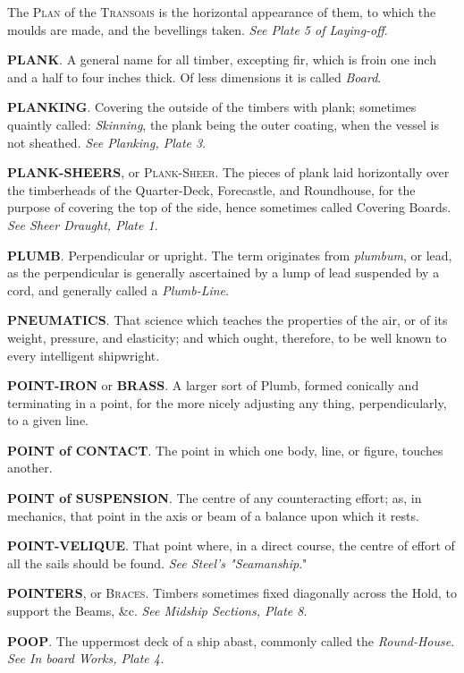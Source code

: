 The \textsc{Plan} of the \textsc{Transoms} is the horizontal appearance of them, to which the moulds are made, and the bevellings taken. \textit{See Plate 5 of Laying-off}. 

\textbf{PLANK}. A general name for all timber, excepting fir, which is froin one inch and a half to four inches thick. Of less dimensions it is called \textit{Board}. 

\textbf{PLANKING}. Covering the outside of the timbers with plank; sometimes quaintly called: \textit{Skinning}, the plank being the outer coating, when the vessel is not sheathed. \textit{See Planking, Plate 3}. 

\textbf{PLANK-SHEERS}, or \textsc{Plank-Sheer}. The pieces of plank laid horizontally over the timberheads of the Quarter-Deck, Forecastle, and Roundhouse, for the purpose of covering the top of the side, hence sometimes called Covering Boards. \textit{See Sheer Draught, Plate 1}.

\textbf{PLUMB}. Perpendicular or upright. The term originates from \textit{plumbum}, or lead, as the perpendicular is generally ascertained by a lump of lead suspended by a cord, and generally called a \textit{Plumb-Line}. 

\textbf{PNEUMATICS}. That science which teaches the properties of the air, or of its weight, pressure, and elasticity; and which ought, therefore, to be well known to every intelligent shipwright. 

\textbf{POINT-IRON} or \textbf{BRASS}. A larger sort of Plumb, formed conically and terminating in a point, for the more nicely adjusting any thing, perpendicularly, to a given line. 

\textbf{POINT of CONTACT}. The point in which one body, line, or figure, touches another.

\textbf{POINT of SUSPENSION}. The centre of any counteracting effort; as, in mechanics, that point in the axis or beam of a balance upon which it rests. 

\textbf{POINT-VELIQUE}. That point where, in a direct course, the centre of effort of all the sails should be found. \textit{See Steel's "Seamanship}."

\textbf{POINTERS}, or \textsc{Braces}. Timbers sometimes fixed diagonally across the Hold, to support the Beams, \&c. \textit{See Midship Sections, Plate 8}. 

\textbf{POOP}. The uppermost deck of a ship abast, commonly called the \textit{Round-House}. \textit{See In board Works, Plate 4.} 

